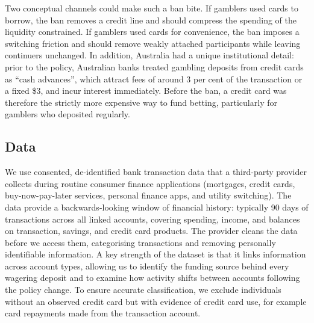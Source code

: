 \documentclass[11pt]{article}
\begin{document}
Two conceptual channels could make such a ban bite. If gamblers used cards to borrow, the ban removes a credit line and should compress the spending of the liquidity constrained. If gamblers used cards for convenience, the ban imposes a switching friction and should remove weakly attached participants while leaving continuers unchanged. In addition, Australia had a unique institutional detail: prior to the policy, Australian banks treated gambling deposits from credit cards as ``cash advances'', which attract fees of around 3 per cent of the transaction or a fixed \$3, and incur interest immediately. Before the ban, a credit card was therefore the strictly more expensive way to fund betting, particularly for gamblers who deposited regularly.

\subsection{Data}
We use consented, de-identified bank transaction data that a third-party provider collects during routine consumer finance applications (mortgages, credit cards, buy-now-pay-later services, personal finance apps, and utility switching). The data provide a backwards-looking window of financial history: typically 90 days of transactions across all linked accounts, covering spending, income, and balances on transaction, savings, and credit card products. The provider cleans the data before we access them, categorising transactions and removing personally identifiable information. A key strength of the dataset is that it links information across account types, allowing us to identify the funding source behind every wagering deposit and to examine how activity shifts between accounts following the policy change. To ensure accurate classification, we exclude individuals without an observed credit card but with evidence of credit card use, for example card repayments made from the transaction account.
\end{document}
